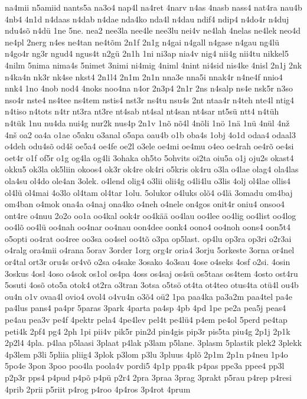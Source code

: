 {na4mii
n5amiid
nants5a
na3o4
nap4l
na4ret
4narv
n4as
4nasb
nass4
nat4ra
nau4b
4nb4
4n1d
n4daas
n4dab
n4dae
nda4ko
nda4l
n4dau
ndif4
ndip4
n4do4r
n4duj
ndu4sõ
n4dü
1ne
5ne.
nea2
nee3la
nee4le
nee3lu
nei4v
ne4lah
4nelas
ne4lek
neo4d
ne4pl
2nerg
n4es
ne4tan
ne4tõm
2n1f
2n1g
n4gai
n4gall
n4gase
n4gau
ng4lü
n4go4r
ng3r
ngud4
ngus4t
n2gü
2n1h
1ni
ni3ap
nia4v
nig4
nii4g
nii4tu
nikkel5
4nilm
5nima
nima4s
5nimet
3nimi
ni4mig
4niml
4nint
ni4sid
nis4ke
4nisl
2n1j
2nk
n4ka4n
nk3r
nk4se
nkst4
2n1l4
2n1m
2n1n
nna3e
nna5i
nnak4r
n4ne4f
nnio4
nnk4
1no
4nob
nod4
4noks
noo4na
n4or
2n3p4
2n1r
2ns
n4salp
ns4e
nsk5r
n3so
nso4r
nste4
ns4tee
ns4tem
nstis4
nst3r
ns4tu
nsu4s
2nt
ntaa4r
n4teh
nte4l
ntig4
n4tiso
n4tots
n4tr
nt3ra
nt3re
nt4sab
nt4sal
nt4san
nt4sar
nt5sü
ntt4
n4tüh
n4tük
1nu
nu4da
nui4g
nur2k
nus4p
2n1v
1nõ
nõ4l
4nõli
1nö
1nä
1nü
4nül
4nž
4nš
oa2
oa4a
o1ae
o5aku
o3anal
o5apa
oau4b
o1b
oba4s
1obj
4o1d
odaa4
odaal3
o4deh
odu4sõ
od4š
oe5a4
oe4fe
oe2l
o3ele
oe4mi
oe4mu
o4eo
oe4rah
oe4rõ
oe4si
oet4r
o1f
of5r
o1g
og4la
og4li
3ohaka
oh5to
5ohvits
oi2ta
oiu5a
o1j
oju2s
okast4
okku5
ok3la
ok5liin
okoos4
ok3r
ok4re
ok4ri
o5kris
ok4ru
o3la
o4lae
olag4
ola4las
ola4su
ol4do
ole4an
3olek.
o4lend
olig4
o3lii
olii4g
o4li4lu
o3lis
4olj
ol4lae
ollis4
ol4lü
ol4mai
4o3lo
ol4tam
ol4tar
1olu.
5olukor
o4luks
olõ4
o4lä
3omadu
om4baj
om4ban
o4mok
ona4a
o4naj
ona4ko
o4neh
o4nele
on4gos
onit4r
oniu4
onsoo4
ont4re
o4nuu
2o2o
oo1a
oo4kal
ook4r
oo4kää
oo4lau
oo4lee
oo4lig
oo4list
oo4log
oo4lõ
oo4lü
oo4nah
oo4nar
oo4nau
oon4dee
oonk4
oono4
oo4noh
oons4
oon5t4
o5opti
oo4rat
oo4ree
oo3sa
oo4sel
oo4tõ
o3pa
op5last.
op4lu
op3ra
op3ri
o2r3ai
o4ralg
ora4mii
o4rana
5orav
3order
1org
org4r
oria4
3orju
5orkeste
3orna
or4nel
or4tal
ort3r
oru4s
or4võ
o2sa
o4sake
3osako
4o3sau
4ose
o4seks
4osf
o2si.
4osin
3oskus
4osl
4oso
o4sok
os1ol
os4pa
4oss
os4saj
os4sü
os5taas
os4tem
4osto
ost4ru
5osuti
4osõ
oto5a
otok4
ot2ra
o3tran
3otsa
o5tsö
ot4ta
ot4teo
otus4ta
otü4l
ou4b
ou4n
o1v
ovaa4l
ovio4
ovol4
o4vu4n
o3õ4
oü2
1pa
paa4ka
pa3a2m
paa4tel
pa4e
pa4lus
pans4
pa4pr
5paras
3park
4parta
pa4sp
4pb
4pd
1pe
pe2a
pea5j
peas4
pe4au
pea3v
pe4f
4pektr
pela4
4pe4lev
pel4t
pe4lü4
p4em
pe4ol
5perd
pe4tap
peti4k
2pf4
pg4
2ph
1pi
pii4v
pik5r
pin2d
pin4gis
pip3r
pis5ta
piu4g
2p1j
2p1k
2p2l4
4pla.
p4laa
p5laasi
3plaat
p4lak
p3lam
p5lane.
3plasm
5plastik
plek2
3plekk
4p3lem
p3li
5pliia
pliig4
3plok
p3lom
p3lu
3pluus
4plõ
2p1m
2p1n
p4neu
1p4o
5po4e
3pon
3poo
poo4la
poola4v
pordi5
4p1p
ppa4k
p4pas
ppe3a
ppee4
pp3l
p2p3r
pps4
p4pud
p4põ
p4pü
p2r4
2pra
3praa
3prag
3prakt
p5rau
p4rep
p4resi
4prib
2prii
p5riit
p4rog
p4roo
4p4ros
3p4rot
4prum
}
